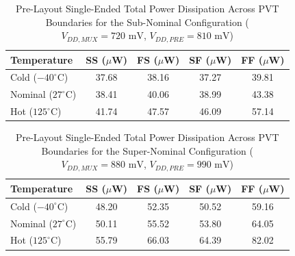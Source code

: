 \begin{table}[H]
    \centering
    \renewcommand{\arraystretch}{1.3}
    \setlength{\tabcolsep}{12pt}
    \small
    \begin{tabular}{|l|c|c|c|c|}
        \hline
        \textbf{Temperature} & \textbf{SS ($\mu$W)} & \textbf{FS ($\mu$W)} & \textbf{SF ($\mu$W)} & \textbf{FF ($\mu$W)} \\ \hline
        Cold ($-40^\circ\text{C}$) & 37.68 & 38.16 & 37.27 & 39.81 \\ \hline
        Nominal ($27^\circ\text{C}$) & 38.41 & 40.06 & 38.99 & 43.38 \\ \hline
        Hot ($125^\circ\text{C}$) & 41.74 & 47.57 & 46.09 & 57.14 \\ \hline
    \end{tabular}
    \vspace{2mm}
    \caption{Pre-Layout Single-Ended Total Power Dissipation Across PVT Boundaries for the Sub-Nominal Configuration ($V_{DD,MUX} = 720\text{ mV}$, $V_{DD,PRE} = 810\text{ mV}$)}
    \label{tab:pre_layout_subnominal_power}
\end{table}

\begin{table}[H]
    \centering
    \renewcommand{\arraystretch}{1.3}
    \setlength{\tabcolsep}{12pt}
    \small
    \begin{tabular}{|l|c|c|c|c|}
        \hline
        \textbf{Temperature} & \textbf{SS ($\mu$W)} & \textbf{FS ($\mu$W)} & \textbf{SF ($\mu$W)} & \textbf{FF ($\mu$W)} \\ \hline
        Cold ($-40^\circ\text{C}$) & 48.20 & 52.35 & 50.52 & 59.16 \\ \hline
        Nominal ($27^\circ\text{C}$) & 50.11 & 55.52 & 53.80 & 64.05 \\ \hline
        Hot ($125^\circ\text{C}$) & 55.79 & 66.03 & 64.39 & 82.02 \\ \hline
    \end{tabular}
    \vspace{2mm}
    \caption{Pre-Layout Single-Ended Total Power Dissipation Across PVT Boundaries for the Super-Nominal Configuration ($V_{DD,MUX} = 880\text{ mV}$, $V_{DD,PRE} = 990\text{ mV}$)}
    \label{tab:pre_layout_supernominal_power}
\end{table}

